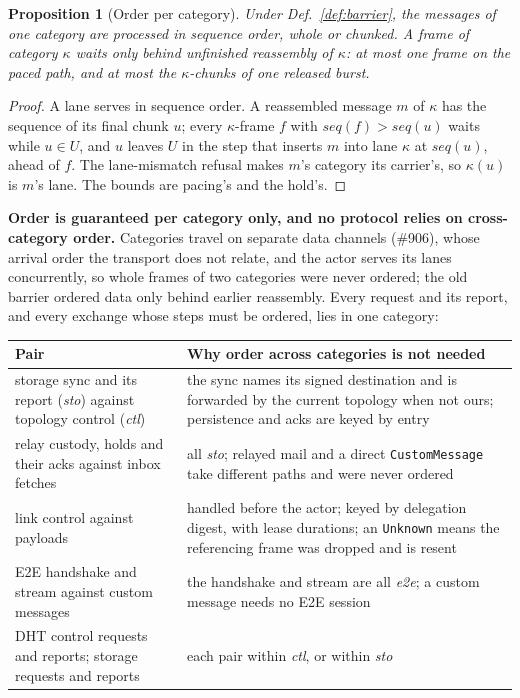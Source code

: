 \documentclass[journal]{IEEEtran}
\newtheorem{proposition}{Proposition}
\newcommand{\issue}[1]{\#{#1}}
\begin{document}
\begin{proposition}[Order per category]\label{prop:catorder}
Under Def.~\ref{def:barrier}, the messages of one category are processed in sequence order,
whole or chunked.  A frame of category $\kappa$ waits only behind unfinished reassembly of
$\kappa$: at most one frame on the paced path, and at most the $\kappa$-chunks of one released
burst.
\end{proposition}
\begin{proof}
A lane serves in sequence order.  A reassembled message $m$ of $\kappa$ has the sequence of its
final chunk $u$; every $\kappa$-frame $f$ with $\mathit{seq}(f)>\mathit{seq}(u)$ waits while
$u\in U$, and $u$ leaves $U$ in the step that inserts $m$ into lane $\kappa$ at
$\mathit{seq}(u)$, ahead of $f$.  The lane-mismatch refusal makes $m$'s category its carrier's,
so $\kappa(u)$ is $m$'s lane.  The bounds are pacing's and the hold's.
\end{proof}

\textbf{Order is guaranteed per category only, and no protocol relies on cross-category
order.}  Categories travel on separate data channels (\issue{906}), whose arrival order the
transport does not relate, and the actor serves its lanes concurrently, so whole frames of two
categories were never ordered; the old barrier ordered data only behind earlier reassembly.
Every request and its report, and every exchange whose steps must be ordered, lies in one
category:
\begin{center}
\footnotesize
\begin{tabular}{@{}p{}p{}@{}}
\toprule
Pair & Why order across categories is not needed\\
\midrule
storage sync and its report (\textit{sto}) against topology control (\textit{ctl}) & the
sync names its signed destination and is forwarded by the current topology when not ours;
persistence and acks are keyed by entry\\
relay custody, holds and their acks against inbox fetches & all \textit{sto}; relayed mail
and a direct \texttt{CustomMessage} take different paths and were never ordered\\
link control against payloads & handled before the actor; keyed by delegation digest, with
lease durations; an \texttt{Unknown} means the referencing frame was dropped and is resent\\
E2E handshake and stream against custom messages & the handshake and stream are all
\textit{e2e}; a custom message needs no E2E session\\
DHT control requests and reports; storage requests and reports & each pair within
\textit{ctl}, or within \textit{sto}\\
\bottomrule
\end{tabular}
\end{center}
\end{document}
